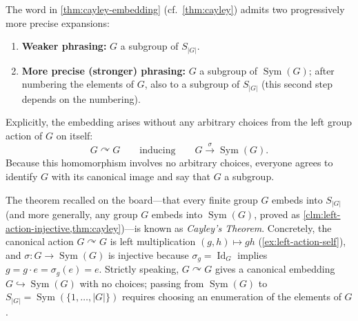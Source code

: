 \begin{content}

The word  in \cref{thm:cayley-embedding} (cf.\ \cref{thm:cayley}) admits two progressively more precise expansions:
\begin{enumerate}[label=\textbf{\arabic*.}]
    \item \textbf{Weaker phrasing:} $G$  a subgroup of $S_{|G|}$.
    \item \textbf{More precise (stronger) phrasing:} $G$  a subgroup of $\operatorname{Sym}(G)$; after numbering the elements of $G$, also to a subgroup of $S_{|G|}$ (this second step depends on the numbering).
\end{enumerate}

Explicitly, the embedding arises without any arbitrary choices from the left group action of $G$ on itself:
\[
G \curvearrowright G \qquad \text{inducing} \qquad G \xrightarrow{\sigma} \operatorname{Sym}(G).
\]
Because this homomorphism involves no arbitrary choices, everyone agrees to identify $G$ with its canonical image and say that $G$  a subgroup.
\end{content}

\begin{aiNote}
The theorem recalled on the board---that every finite group $G$ embeds into $S_{|G|}$ (and more generally, any group $G$ embeds into $\operatorname{Sym}(G)$, proved as \cref{clm:left-action-injective,thm:cayley})---is known as \emph{Cayley's Theorem}. Concretely, the canonical action $G \curvearrowright G$ is left multiplication $(g, h) \mapsto gh$ (\cref{ex:left-action-self}), and $\sigma \colon G \to \operatorname{Sym}(G)$ is injective because $\sigma_g = \operatorname{Id}_G$ implies $g = g \cdot e = \sigma_g(e) = e$. Strictly speaking, $G \curvearrowright G$ gives a canonical embedding $G \hookrightarrow \operatorname{Sym}(G)$ with no choices; passing from $\operatorname{Sym}(G)$ to $S_{|G|} = \operatorname{Sym}(\{1, \dots, |G|\})$ requires choosing an enumeration of the elements of $G$.
\end{aiNote}

